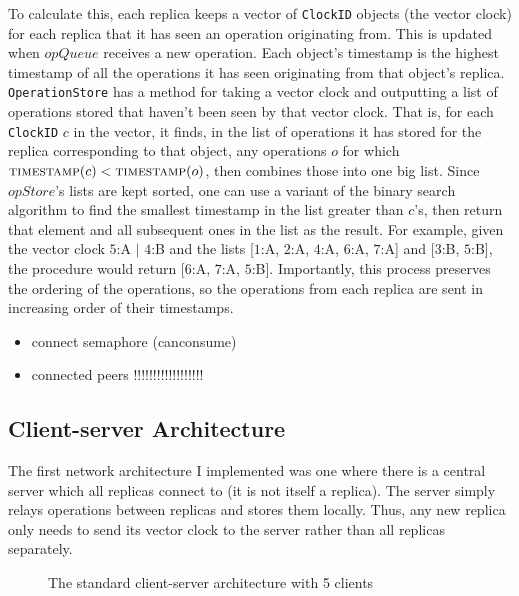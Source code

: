 \documentclass[diss.tex]{subfiles}
\begin{document}
To calculate this, each replica keeps a vector of \texttt{ClockID} objects (the vector clock) for each replica that it has seen an operation originating from. This is updated when $opQueue$ receives a new operation. Each object's timestamp is the highest timestamp of all the operations it has seen originating from that object's replica. \texttt{OperationStore} has a method for taking a vector clock and outputting a list of operations stored that haven't been seen by that vector clock. That is, for each \texttt{ClockID} $c$ in the vector, it finds, in the list of operations it has stored for the replica corresponding to that object, any operations $o$ for which $\textsc{timestamp}(c) < \textsc{timestamp}(o)$, then combines those into one big list. Since $opStore$'s lists are kept sorted, one can use a variant of the binary search algorithm to find the smallest timestamp in the list greater than $c$'s, then return that element and all subsequent ones in the list as the result. For example, given the vector clock $5$:A $|$ $4$:B and the lists [$1$:A, $2$:A, $4$:A, $6$:A, $7$:A] and [$3$:B, $5$:B], the procedure would return [$6$:A, $7$:A, $5$:B]. Importantly, this process preserves the ordering of the operations, so the operations from each replica are sent in increasing order of their timestamps. 

\begin{itemize}
\item connect semaphore (canconsume)
\item connected peers !!!!!!!!!!!!!!!!!!
\end{itemize}
\subsection{Client-server Architecture}

The first network architecture I implemented was one where there is a central server which all replicas connect to (it is not itself a replica). The server simply relays operations between replicas and stores them locally. Thus, any new replica only needs to send its vector clock to the server rather than all replicas separately.

\begin{figure}[H]
\centering
{}
\caption{The standard client-server architecture with 5 clients}
\label{fig:clsv}
\end{figure}
\end{document}
